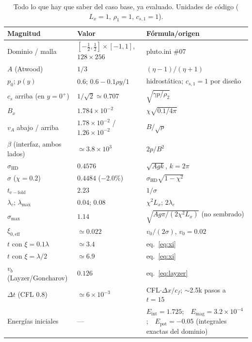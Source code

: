 \documentclass[11pt,a4paper]{article}
\begin{document}
\begin{table}[htbp]
\centering\small
\caption{Todo lo que hay que saber del caso base, ya evaluado. Unidades de código
($L_x=1$, $\rho_1=1$, $c_{s,1}=1$).}
\begin{tabular}{@{}llp{6.9cm}@{}}
\toprule
Magnitud & Valor & Fórmula/origen \\
\midrule
Dominio / malla & $[-\tfrac12,\tfrac12]\times[-1,1]$, $128\times256$ & pluto.ini \#07 \\
$A$ (Atwood) & $1/3$ & $(\eta-1)/(\eta+1)$ \\
$p_0$; $p(y)$ & $0.6$; $0.6-0.1\rho y/1$ & hidrostática; $c_{s,1}=1$ por diseño \\
$c_s$ arriba (en $y=0^+$) & $1/\sqrt2\simeq0.707$ & $\sqrt{\gamma p/\rho_2}$ \\
$B_x$ & $1.784\times10^{-2}$ & $\chi\sqrt{0.1/4\pi}$ \\
$v_A$ abajo / arriba & $1.78\times10^{-2}$ / $1.26\times10^{-2}$ & $B/\sqrt\rho$ \\
$\beta$ (interfaz, ambos lados) & $\simeq3.8\times10^{3}$ & $2p/B^2$ \\
$\sigma_\mathrm{HD}$ & $0.4576$ & $\sqrt{Agk}$, $k=2\pi$ \\
$\sigma$ ($\chi=0.2$) & $0.4484$ ($-2.0\%$) & $\sigma_\mathrm{HD}\sqrt{1-\chi^2}$ \\
$t_\mathrm{e-fold}$ & $2.23$ & $1/\sigma$ \\
$\lambda_c$; $\lambda_\mathrm{max}$ & $0.04$; $0.08$ & $\chi^2L_x$; $2\lambda_c$ \\
$\sigma_\mathrm{max}$ & $1.14$ & $\sqrt{Ag\pi/(2\chi^2L_x)}$ (no sembrado) \\
$\xi_{0,\mathrm{eff}}$ & $\simeq0.022$ & $v_0/(2\sigma)$, $v_0=0.02$ \\
$t$ con $\xi=0.1\lambda$ & $\simeq3.4$ & eq.~\eqref{eq:xi} \\
$t$ con $\xi=\lambda/2$ & $\simeq6.9$ & eq.~\eqref{eq:xi} \\
$v_b$ (Layzer/Goncharov) & $0.126$ & eq.~\eqref{eq:layzer} \\
$\Delta t$ (CFL 0.8) & $\simeq6\times10^{-3}$ & CFL$\cdot\Delta x/c_f$; $\sim$2.5k pasos a $t=15$ \\
Energías iniciales & --- & $E_\mathrm{int}=1.725$;\ \ $E_\mathrm{mag}=3.2\times10^{-4}$;\ \ $E_\mathrm{pot}=-0.05$ (integrales exactas del dominio) \\
\bottomrule
\end{tabular}
\end{table}
\end{document}
